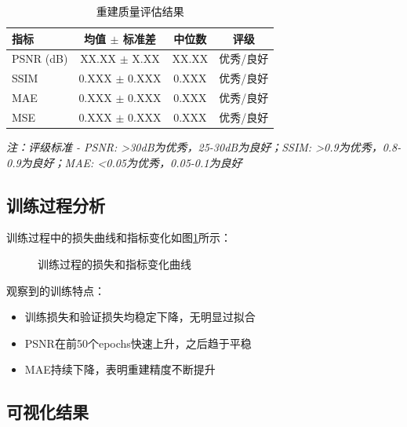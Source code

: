 \documentclass[11pt,a4paper]{article}
\begin{document}
\begin{table}[htbp]
    \centering
    \caption{重建质量评估结果}
    \label{tab:results}
    \begin{tabular}{lccc}
        \toprule
        \textbf{指标} & \textbf{均值 $\pm$ 标准差} & \textbf{中位数} & \textbf{评级} \\
        \midrule
        PSNR (dB) & XX.XX $\pm$ X.XX & XX.XX & 优秀/良好 \\
        SSIM & 0.XXX $\pm$ 0.XXX & 0.XXX & 优秀/良好 \\
        MAE & 0.XXX $\pm$ 0.XXX & 0.XXX & 优秀/良好 \\
        MSE & 0.XXX $\pm$ 0.XXX & 0.XXX & 优秀/良好 \\
        \bottomrule
    \end{tabular}
    \vspace{0.3cm}

    \footnotesize
    \textit{注：评级标准 - PSNR: >30dB为优秀，25-30dB为良好；SSIM: >0.9为优秀，0.8-0.9为良好；MAE: <0.05为优秀，0.05-0.1为良好}
\end{table}

\subsection{训练过程分析}

训练过程中的损失曲线和指标变化如图\ref{fig:training_curves}所示：

\begin{figure}[htbp]
    \centering
    \caption{训练过程的损失和指标变化曲线}
    \label{fig:training_curves}
\end{figure}

观察到的训练特点：
\begin{itemize}
    \item 训练损失和验证损失均稳定下降，无明显过拟合
    \item PSNR在前50个epochs快速上升，之后趋于平稳
    \item MAE持续下降，表明重建精度不断提升
\end{itemize}

\subsection{可视化结果}
\end{document}
